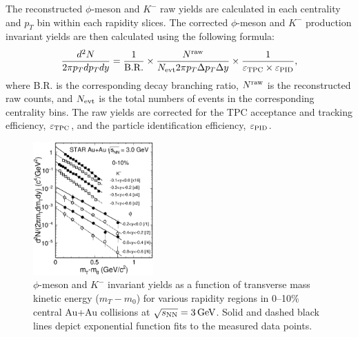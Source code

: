 \documentclass[%
 reprint,	
showpacs,
 amsmath,amssymb,
 aps,
 prc,
]{revtex4-1}
\begin{document}
The reconstructed $\phi$-meson and $K^-$ raw yields are calculated in each centrality and $p_{T}$ bin within each rapidity slices. The corrected $\phi$-meson and $K^-$ production invariant yields are then calculated using the following formula:
\begin{equation}
  \begin{aligned}
 \frac{d^2N}{2\pi p_{T}dp_{T}dy} = \frac{1}{\rm B.R.} \times \frac{N^{\rm raw}}{N_{\rm evt} 2\pi p_{T}\Delta p_{T}\Delta y} \times \frac{1}{\varepsilon_{\rm TPC}\times\varepsilon_{\rm PID}},
  \end{aligned}
\label{equ:invariantyield}
\end{equation}
where B.R. is the corresponding decay branching ratio, $N^{\rm raw}$ is the reconstructed raw counts, and $N_{\rm evt}$ is the total numbers of events in the corresponding centrality bins. The raw yields are corrected for the TPC acceptance and tracking efficiency, $\varepsilon_{\rm TPC}$, and the particle identification efficiency, $\varepsilon_{\rm PID}$.

\begin{figure}
\centering
\includegraphics[width=0.41\textwidth]{fig/fig2_h_mT_spectra_phiMeson.eps}
  \caption{ $\phi$-meson and $K^-$ invariant yields as a function of transverse mass kinetic energy ($m_T-m_0$) for various rapidity regions in 0--10\% central Au+Au collisions at ${\sqrt{s_{\rm NN}} = \rm{3\,GeV}}$. Solid and dashed black lines depict exponential function fits to the measured data points.}
\label{fig:phimTSpectra} 
\end{figure}
\end{document}
